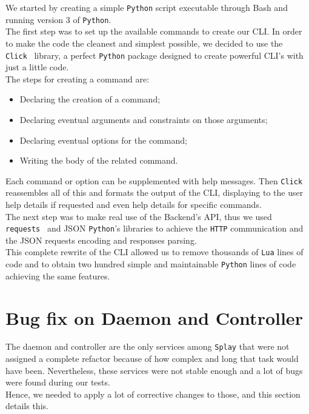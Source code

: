 \documentclass{eplmastersthesis}
\begin{document}
        We started by creating a simple \texttt{Python} script executable
        through Bash and running version 3 of \texttt{Python}.\\

        The first step was to set up the available commands to create our CLI.
        In order to make the code the cleanest and simplest possible, we
        decided to use the \texttt{Click}~\cite{click} library, a perfect
        \texttt{Python} package designed to create powerful CLI's with just a little
        code.\\
        The steps for creating a command are:

        \begin{itemize}
          \item Declaring the creation of a command;
          \item Declaring eventual arguments and constraints on those arguments;
          \item Declaring eventual options for the command;
          \item Writing the body of the related command.
        \end{itemize}

        Each command or option can be supplemented with help messages. Then
        \texttt{Click} reassembles all of this and formats the output of the CLI,
        displaying to the user help details if requested and even help details
        for specific commands.\\

        The next step was to make real use of the Backend's API, thus we used
        \texttt{requests}~\cite{requests} and JSON \texttt{Python}'s libraries to
        achieve the \texttt{HTTP} communication and the JSON requests encoding and
        responses parsing.\\

        This complete rewrite of the CLI allowed us to remove thousands of
        \texttt{Lua} lines of code and to obtain two hundred simple and
        maintainable \texttt{Python} lines of code achieving the same features.

    \section{Bug fix on Daemon and Controller}

      The daemon and controller are the only services
      among \texttt{Splay} that were not assigned a complete refactor because of how
      complex and long that task would have been. Nevertheless, these services
      were not stable enough and a lot of bugs were found during our tests.\\
      Hence, we needed to apply a lot of corrective changes to those, and
      this section details this.
\end{document}
